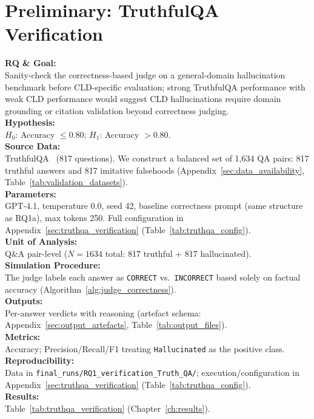 \section{Preliminary: TruthfulQA Verification}
\label{sec:rq1_verification}

\noindent\textbf{RQ \& Goal:}\\
Sanity-check the correctness-based judge on a general-domain hallucination benchmark before CLD-specific evaluation; strong TruthfulQA performance with weak CLD performance would suggest CLD hallucinations require domain grounding or citation validation beyond correctness judging.\\
\textbf{Hypothesis:}\\
$H_0$: Accuracy $\leq 0.80$; $H_1$: Accuracy $> 0.80$.\\
\textbf{Source Data:}\\
TruthfulQA~\cite{lin2022truthfulqa} (817 questions). We construct a balanced set of 1{,}634 QA pairs: 817 truthful answers and 817 imitative falsehoods (Appendix~\ref{sec:data_availability}, Table~\ref{tab:validation_datasets}).\\
\textbf{Parameters:}\\
GPT-4.1, temperature 0.0, seed 42, baseline correctness prompt (same structure as RQ1a), max tokens 250. Full configuration in Appendix~\ref{sec:truthqa_verification} (Table~\ref{tab:truthqa_config}).\\
\textbf{Unit of Analysis:}\\
Q\&A pair-level ($N=1634$ total: 817 truthful $+$ 817 hallucinated).\\
\textbf{Simulation Procedure:}\\
The judge labels each answer as \texttt{CORRECT} vs.\ \texttt{INCORRECT} based solely on factual accuracy (Algorithm~\ref{alg:judge_correctness}).\\
\textbf{Outputs:}\\
Per-answer verdicts with reasoning (artefact schema: Appendix~\ref{sec:output_artefacts}, Table~\ref{tab:output_files}).\\
\textbf{Metrics:}\\
Accuracy; Precision/Recall/F1 treating \texttt{Hallucinated} as the positive class.\\
\textbf{Reproducibility:}\\
Data in \texttt{final\_runs/RQ1\_verification\_Truth\_QA/}; execution/configuration in Appendix~\ref{sec:truthqa_verification} (Table~\ref{tab:truthqa_config}).\\
\textbf{Results:}\\
Table~\ref{tab:truthqa_verification} (Chapter~\ref{ch:results}).

